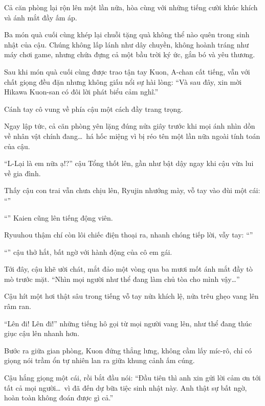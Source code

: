 \documentclass[../main.tex]{subfiles}
\begin{document}
Cả căn phòng lại rộn lên một lần nữa, hòa cùng với những tiếng cười khúc khích và ánh mắt đầy ấm áp.

Ba món quà cuối cùng khép lại chuỗi tặng quà không thể nào quên trong sinh nhật của cậu. Chúng không lấp lánh như dây chuyền, không hoành tráng như máy chơi game, nhưng chứa đựng cả một bầu trời ký ức, gắn bó và yêu thương.

\ct

Sau khi món quà cuối cùng được trao tận tay Kuon, A-chan cất tiếng, vẫn với chất giọng đều đặn nhưng không giấu nổi sự hài lòng: ``Và sau đây, xin mời Hikawa Kuon-san có đôi lời phát biểu cảm nghĩ.''

Cánh tay cô vung về phía cậu một cách đầy trang trọng.

Ngay lập tức, cả căn phòng yên lặng đúng nửa giây trước khi mọi ánh nhìn dồn về nhân vật chính đang\dots\ há hốc miệng vì bị réo tên một lần nữa ngoài tính toán của cậu.

``L-Lại là em nữa ạ!?'' cậu Tổng thốt lên, gần như bật dậy ngay khi cậu vừa lui về gia đình.

Thấy cậu con trai vẫn chưa chịu lên, Ryujin nhướng mày, vỗ tay vào đùi một cái: ``''

``'' Kaien cũng lên tiếng động viên.

Ryuuhou thậm chí còn lôi chiếc điện thoại ra, nhanh chóng tiếp lời, vẫy tay: ``''

``'' cậu thở hắt, bất ngờ với hành động của cô em gái.

Tới đây, cậu khẽ ười chát, mắt đảo một vòng qua ba mươi mốt ánh mắt đầy tò mò trước mặt. ``Nhìn mọi người như thể đang làm chủ tòa cho mình vậy\dots''

Cậu hít một hơi thật sâu trong tiếng vỗ tay nửa khích lệ, nửa trêu ghẹo vang lên râm ran.

``Lên đi! Lên đi!'' những tiếng hô gọi từ mọi người vang lên, như thể đang thúc giục cậu lên nhanh hơn.

Bước ra giữa gian phòng, Kuon đứng thẳng lưng, không cầm lấy míc-rô, chỉ có giọng nói trầm ổn tự nhiên lan ra giữa khung cảnh ấm cúng.

Cậu hắng giọng một cái, rồi bắt đầu nói: ``Đầu tiên thì anh xin gửi lời cảm ơn tới tất cả mọi người\dots\ vì đã đến dự bữa tiệc sinh nhật này. Anh thật sự bất ngờ, hoàn toàn không đoán được gì cả.''
\end{document}

